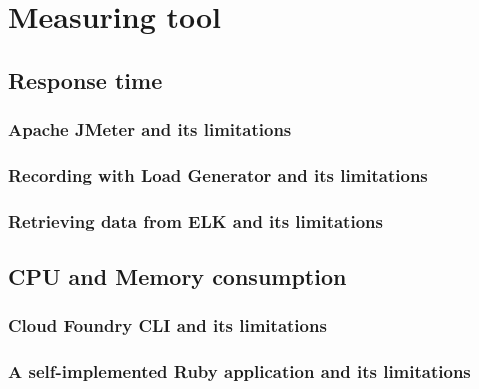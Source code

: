 \chapter{Measuring tool}
\section{Response time}
\subsection{Apache JMeter and its limitations}
\subsection{Recording with Load Generator and its limitations}
\subsection{Retrieving data from ELK and its limitations}
\section{CPU and Memory consumption}
\subsection{Cloud Foundry CLI and its limitations}
\subsection{A self-implemented  Ruby application and its limitations}


